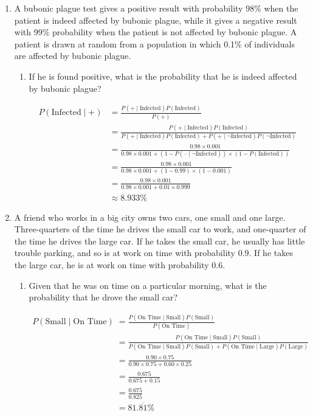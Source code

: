 \documentclass[12pt]{article}
\begin{document}
\begin{enumerate}
\item A bubonic plague test gives a positive result with probability 98\% when the patient is indeed affected by bubonic plague, while it gives a negative result with 99\% probability when the patient is not affected by bubonic plague. A patient is drawn at random from a population in which 0.1\% of individuals are affected by bubonic plague.
  \begin{enumerate}
  \item If he is found positive, what is the probability that he is indeed affected by bubonic plague?

  \begin{align*}
    P(\text{Infected}\mid\text{+}) &= \frac{P(\text{+}\mid\text{Infected}) P(\text{Infected})}{P(\text{+})} \\
    &= \frac{P(\text{+}\mid\text{Infected}) P(\text{Infected})}{P(\text{+}\mid\text{Infected})  P(\text{Infected}) + P(\text{+}\mid\neg\text{Infected}) P(\neg\text{Infected})} \\[8pt]
    &= \frac{0.98 \times 0.001}{0.98 \times 0.001 + (1 - P(\text{--}\mid\neg\text{Infected})) \times (1 - P(\text{Infected}))} \\[8pt]
    &= \frac{0.98 \times 0.001}{0.98 \times 0.001 + (1 - 0.99) \times (1 - 0.001)} \\[8pt]
        &= \frac{0.98 \times 0.001}{0.98 \times 0.001 + 0.01 \times 0.999} \\[8pt]
    &\approx \boxed{8.933\%}
  \end{align*}

  \end{enumerate}
\newpage

\item A friend who works in a big city owns two cars, one small and one large. Three-quarters of the time he drives the small car to work, and one-quarter of the time he drives the large car. If he takes the small car, he usually has little trouble parking, and so is at work on time with probability 0.9. If he takes the large car, he is at work on time with probability 0.6.
  \begin{enumerate}
  \item Given that he was on time on a particular morning, what is the probability that he drove the small car?

  \begin{align*}
    P(\text{Small}\mid\text{On Time}) &= \frac{P(\text{On Time}\mid\text{Small}) P(\text{Small})}{P(\text{On Time})} \\
    &= \frac{P(\text{On Time}\mid\text{Small}) P(\text{Small})}{P(\text{On Time}\mid\text{Small})  P(\text{Small}) + P(\text{On Time}\mid\text{Large})  P(\text{Large})} \\[8pt]
    &= \frac{0.90 \times 0.75}{0.90 \times 0.75 + 0.60 \times 0.25} \\[8pt]
    &= \frac{0.675}{0.675 + 0.15} \\[8pt]
        &= \frac{0.675}{0.825} \\[8pt]
    &= \boxed{81.\overline{81}\%}
  \end{align*}


\end{enumerate}
\end{enumerate}
\end{document}
